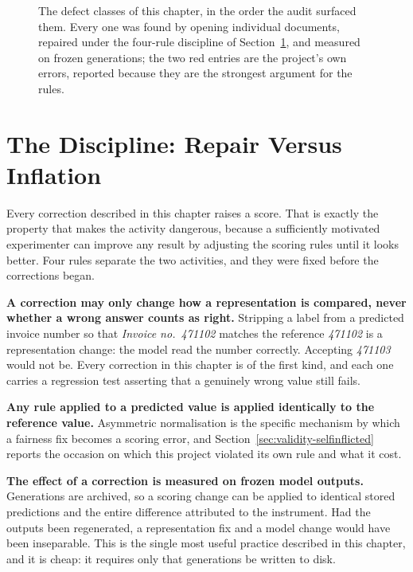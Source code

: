 \begin{figure}[htbp]
  \centering
  
  \caption[The defect classes and their evidence]{The defect classes of this chapter, in
  the order the audit surfaced them. Every one was found by opening individual documents,
  repaired under the four-rule discipline of Section~\ref{sec:validity-discipline}, and measured
  on frozen generations; the two red entries are the project's own errors, reported
  because they are the strongest argument for the rules.}
  \label{fig:defect-chronology}
\end{figure}

\section{The Discipline: Repair Versus Inflation}
\label{sec:validity-discipline}

Every correction described in this chapter raises a score. That is exactly the property that
makes the activity dangerous, because a sufficiently motivated experimenter can improve any
result by adjusting the scoring rules until it looks better. Four rules separate the two
activities, and they were fixed before the corrections began.

\textbf{A correction may only change how a representation is compared, never whether a wrong
answer counts as right.} Stripping a label from a predicted invoice number so that
\emph{Invoice no.\ 471102} matches the reference \emph{471102} is a representation change: the
model read the number correctly. Accepting \emph{471103} would not be. Every correction in this
chapter is of the first kind, and each one carries a regression test asserting that a
genuinely wrong value still fails.

\textbf{Any rule applied to a predicted value is applied identically to the reference value.}
Asymmetric normalisation is the specific mechanism by which a fairness fix becomes a scoring
error, and Section~\ref{sec:validity-selfinflicted} reports the occasion on which this project
violated its own rule and what it cost.

\textbf{The effect of a correction is measured on frozen model outputs.} Generations are
archived, so a scoring change can be applied to identical stored predictions and the entire
difference attributed to the instrument. Had the outputs been regenerated, a representation fix
and a model change would have been inseparable. This is the single most useful practice
described in this chapter, and it is cheap: it requires only that generations be written to
disk.

